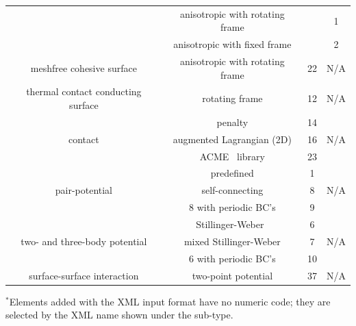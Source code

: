 \begin{table}[h]
\begin{center}
\begin{tabular}[c]{|c|c|c|c|}
\hhline{~-~-}
& anisotropic with rotating frame & & 1\\
\hhline{~-~-}
& anisotropic with fixed frame & & 2\\
\hline
meshfree cohesive surface & 
anisotropic with rotating frame & 22 & N/A\\
\hline
{\centering thermal contact conducting surface} & rotating frame & 12 & N/A\\
\hline
\multirow{3}{1.5in}{\centering contact} & penalty & 14& 
\multirow{3}{0.75in}{\centering N/A}\\
\hhline{~--~}
& augmented Lagrangian (2D) & 16 & \\
\hhline{~--~}
& \textsf{ACME}~\cite{ACME} library & 23 & \\
\hline
\multirow{3}{1.5in}{\centering pair-potential} & predefined & 1 &
\multirow{3}{0.75in}{\centering N/A}\\
\hhline{~--~}
& self-connecting & 8 & \\
\hhline{~--~}
& 8 with periodic BC's & 9 & \\
\hline
\multirow{3}{1.5in}{\centering two- and three-body potential} 
& Stillinger-Weber~\cite{Stillinger1985}  & 6 &
\multirow{3}{0.75in}{\centering N/A}\\
\hhline{~--~}
& mixed Stillinger-Weber & 7 & \\
\hhline{~--~}
& 6 with periodic BC's & 10 & \\
\hline
{\centering surface-surface interaction} & two-point potential & 37 & N/A\\
\hline
\end{tabular}
\end{center}
{\footnotesize $^{\ast}$Elements added with the XML input format have no numeric code; they are
selected by the XML name shown under the sub-type.}
\end{table}

